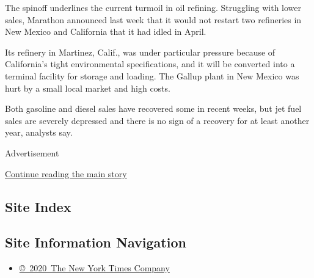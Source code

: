 The spinoff underlines the current turmoil in oil refining. Struggling
with lower sales, Marathon announced last week that it would not restart
two refineries in New Mexico and California that it had idled in April.

Its refinery in Martinez, Calif., was under particular pressure because
of California's tight environmental specifications, and it will be
converted into a terminal facility for storage and loading. The Gallup
plant in New Mexico was hurt by a small local market and high costs.

Both gasoline and diesel sales have recovered some in recent weeks, but
jet fuel sales are severely depressed and there is no sign of a recovery
for at least another year, analysts say.

Advertisement

\protect\hyperlink{after-bottom}{Continue reading the main story}

\hypertarget{site-index}{%
\subsection{Site Index}\label{site-index}}

\hypertarget{site-information-navigation}{%
\subsection{Site Information
Navigation}\label{site-information-navigation}}

\begin{itemize}
\tightlist
\item
  \href{https://help.nytimes3xbfgragh.onion/hc/en-us/articles/115014792127-Copyright-notice}{©~2020~The
  New York Times Company}
\end{itemize}

